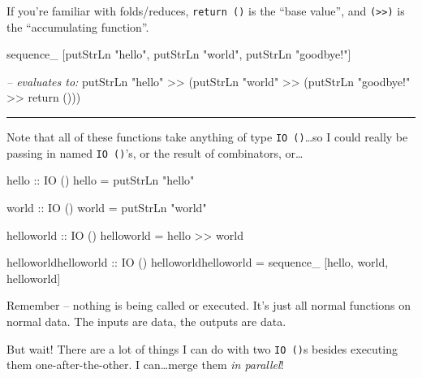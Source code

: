 \documentclass[]{article}
\newenvironment{Shaded}{}{}
\newcommand{\DataTypeTok}[1]{\textcolor[rgb]{0.56,0.13,0.00}{{#1}}}
\newcommand{\StringTok}[1]{\textcolor[rgb]{0.25,0.44,0.63}{{#1}}}
\newcommand{\CommentTok}[1]{\textcolor[rgb]{0.38,0.63,0.69}{\textit{{#1}}}}
\newcommand{\OtherTok}[1]{\textcolor[rgb]{0.00,0.44,0.13}{{#1}}}
\newcommand{\FunctionTok}[1]{\textcolor[rgb]{0.02,0.16,0.49}{{#1}}}
\newcommand{\NormalTok}[1]{{#1}}
\begin{document}
If you're familiar with folds/reduces, \texttt{return\ ()} is the ``base
value'', and \texttt{(\textgreater{}\textgreater{})} is the
``accumulating function''.

\begin{Shaded}
\begin{Highlighting}[]
\NormalTok{sequence_ [putStrLn }\StringTok{"hello"}\NormalTok{, putStrLn }\StringTok{"world"}\NormalTok{, putStrLn }\StringTok{"goodbye!"}\NormalTok{]}

\CommentTok{-- evaluates to:}
\NormalTok{putStrLn }\StringTok{"hello"} \FunctionTok{>>} \NormalTok{(putStrLn }\StringTok{"world"} \FunctionTok{>>} \NormalTok{(putStrLn }\StringTok{"goodbye!"} \FunctionTok{>>} \NormalTok{return ()))}
\end{Highlighting}
\end{Shaded}

\begin{center}\rule{0.5\linewidth}{\linethickness}\end{center}

Note that all of these functions take anything of type
\texttt{IO\ ()}\ldots{}so I could really be passing in named
\texttt{IO\ ()}'s, or the result of combinators, or\ldots{}

\begin{Shaded}
\begin{Highlighting}[]
\OtherTok{hello ::} \DataTypeTok{IO} \NormalTok{()}
\NormalTok{hello }\FunctionTok{=} \NormalTok{putStrLn }\StringTok{"hello"}

\OtherTok{world ::} \DataTypeTok{IO} \NormalTok{()}
\NormalTok{world }\FunctionTok{=} \NormalTok{putStrLn }\StringTok{"world"}

\OtherTok{helloworld ::} \DataTypeTok{IO} \NormalTok{()}
\NormalTok{helloworld }\FunctionTok{=} \NormalTok{hello }\FunctionTok{>>} \NormalTok{world}

\OtherTok{helloworldhelloworld ::} \DataTypeTok{IO} \NormalTok{()}
\NormalTok{helloworldhelloworld }\FunctionTok{=} \NormalTok{sequence_ [hello, world, helloworld]}
\end{Highlighting}
\end{Shaded}

Remember -- nothing is being called or executed. It's just all normal
functions on normal data. The inputs are data, the outputs are data.

But wait! There are a lot of things I can do with two \texttt{IO\ ()}s
besides executing them one-after-the-other. I can\ldots{}merge them
\emph{in parallel}!
\end{document}
